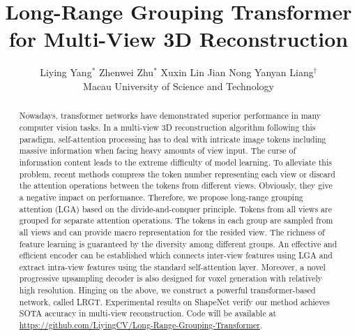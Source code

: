 \documentclass[10pt,twocolumn,letterpaper]{article}
\begin{document}
\title{Long-Range Grouping Transformer for Multi-View 3D Reconstruction}

\author{Liying Yang$^{*}$\hspace{0.05in}
Zhenwei Zhu$^{*}$\hspace{0.05in}
Xuxin Lin\hspace{0.05in}
Jian Nong\hspace{0.05in}
Yanyan Liang$^{\dag}$\\
Macau University of Science and Technology\hspace{0.1in} \\
}
\maketitle


\renewcommand{\thefootnote}{\fnsymbol{footnote}}

\begin{abstract}
Nowadays, transformer networks have demonstrated superior performance in many computer vision tasks. In a multi-view 3D reconstruction algorithm following this paradigm, self-attention processing has to deal with intricate image tokens including massive information when facing heavy amounts of view input. The curse of information content leads to the extreme difficulty of model learning. To alleviate this problem, recent methods compress the token number representing each view or discard the attention operations between the tokens from different views. Obviously, they give a negative impact on performance. Therefore, we propose long-range grouping attention (LGA) based on the divide-and-conquer principle. Tokens from all views are grouped for separate attention operations. The tokens in each group are sampled from all views and can provide macro representation for the resided view. The richness of feature learning is guaranteed by the diversity among different groups. An effective and efficient encoder can be established which connects inter-view features using LGA and extract intra-view features using the standard self-attention layer. Moreover, a novel progressive upsampling decoder is also designed for voxel generation with relatively high resolution. Hinging on the above, we construct a powerful transformer-based network, called LRGT. Experimental results on ShapeNet verify our method achieves SOTA accuracy in multi-view reconstruction. Code will be available at \url{https://github.com/LiyingCV/Long-Range-Grouping-Transformer}.
\end{abstract}
\end{document}

